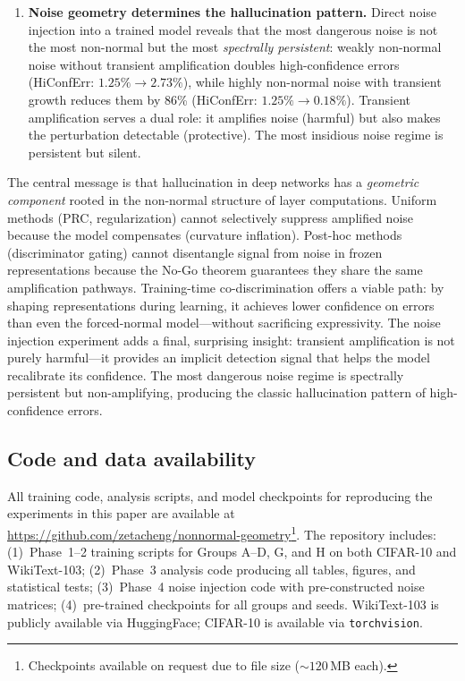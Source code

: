 \documentclass[11pt,a4paper]{article}
\theoremstyle{definition}
\begin{document}
\begin{enumerate}[nosep]
        HiConfErr by 52.5\% ($p = 0.0010$) with no PPL penalty.
        The gate again decays to zero, but the effect persists
        through shaped representations---the discriminator acts as
        a transient training signal. The ECE tradeoff ($0.056$
        vs.\ $0.009$) remains an open issue.
  \item \textbf{Noise geometry determines the hallucination pattern.}
        Direct noise injection into a trained model reveals that
        the most dangerous noise is not the most non-normal but the
        most \emph{spectrally persistent}: weakly non-normal noise
        without transient amplification doubles high-confidence
        errors (HiConfErr: $1.25\% \to 2.73\%$), while highly
        non-normal noise with transient growth reduces them by 86\%
        (HiConfErr: $1.25\% \to 0.18\%$). Transient amplification
        serves a dual role: it amplifies noise (harmful) but also
        makes the perturbation detectable (protective). The most
        insidious noise regime is persistent but silent.
\end{enumerate}

The central message is that hallucination in deep networks has a
\emph{geometric component} rooted in the non-normal structure of
layer computations. Uniform methods (PRC, regularization) cannot
selectively suppress amplified noise because the model compensates
(curvature inflation). Post-hoc methods (discriminator gating)
cannot disentangle signal from noise in frozen representations
because the No-Go theorem guarantees they share the same
amplification pathways. Training-time co-discrimination offers
a viable path: by shaping representations during learning, it
achieves lower confidence on errors than even the forced-normal
model---without sacrificing expressivity. The noise injection
experiment adds a final, surprising insight: transient amplification
is not purely harmful---it provides an implicit detection signal
that helps the model recalibrate its confidence. The most dangerous
noise regime is spectrally persistent but non-amplifying, producing
the classic hallucination pattern of high-confidence errors.

\subsection*{Code and data availability}

All training code, analysis scripts, and model checkpoints for
reproducing the experiments in this paper are available at
\url{https://github.com/zetacheng/nonnormal-geometry}\footnote{Checkpoints
available on request due to file size (${\sim}120$\,MB each).}. The
repository includes: (1)~Phase~1--2 training scripts for Groups A--D,
G, and H on both CIFAR-10 and WikiText-103; (2)~Phase~3 analysis
code producing all tables, figures, and statistical tests;
(3)~Phase~4 noise injection code with pre-constructed noise matrices;
(4)~pre-trained checkpoints for all groups and seeds. WikiText-103
is publicly available via HuggingFace; CIFAR-10 is available via
\texttt{torchvision}.
\end{document}

